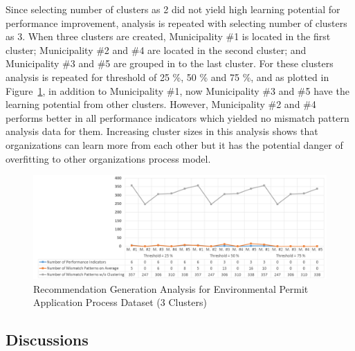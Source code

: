 Since selecting number of clusters as 2 did not yield high learning potential for performance improvement, analysis is repeated with selecting number of clusters as 3. When three clusters are created, Municipality \#1 is located in the first cluster; Municipality \#2 and \#4 are located in the second cluster; and Municipality \#3 and \#5 are grouped in to the last cluster. For these clusters analysis is repeated for threshold of 25 \%, 50 \% and 75 \%, and as plotted in Figure~\ref{fig:coselog-wabo-recommendation-generation-analysis-k3}, in addition to Municipality \#1, now Municipality \#3 and \#5 have the learning potential from other clusters. However, Municipality \#2 and \#4 performs better in all performance indicators which yielded no mismatch pattern analysis data for them. Increasing cluster sizes in this analysis shows that organizations can learn more from each other but it has the potential danger of overfitting to other organizations process model. 
\begin{figure}
	\centering
	\includegraphics[width=\textwidth]{5_results_discussions/coselog-wabo/recommendation-generation-analysis-k3}
	\caption{Recommendation Generation Analysis for Environmental Permit Application Process Dataset (3 Clusters)}
  \label{fig:coselog-wabo-recommendation-generation-analysis-k3}
\end{figure}

\subsection{Discussions}
\label{sec:coselog-discussions}

